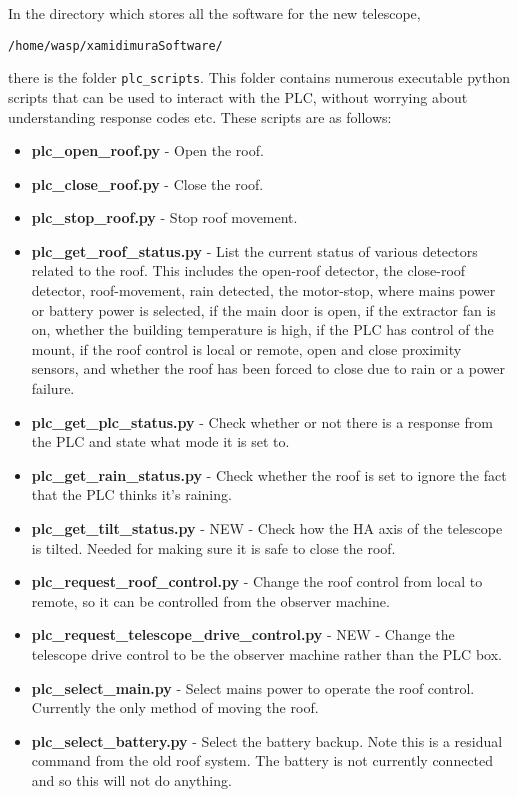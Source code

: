 \documentclass[a4paper,12pt]{article}
\begin{document}
In the directory which stores all the software for the new telescope,
\begin{verbatim}
/home/wasp/xamidimuraSoftware/
\end{verbatim}
there is the folder {\tt plc\_scripts}. This folder contains numerous executable python scripts that can be used to interact with the PLC, without worrying about understanding response codes etc. These scripts are as follows:
\begin{itemize}
\item{{\bf plc\_open\_roof.py} - Open the roof.}
\item{{\bf plc\_close\_roof.py} - Close the roof.}
\item{{\bf plc\_stop\_roof.py} - Stop roof movement.}
\item{{\bf plc\_get\_roof\_status.py} - List the current status of various detectors related to the roof. This includes the open-roof detector, the close-roof detector, roof-movement, rain detected, the motor-stop, where mains power or battery power is selected, if the main door is open, if the extractor fan is on, whether the building temperature is high, if the PLC has control of the mount, if the roof control is local or remote, open and close proximity sensors, and whether the roof has been forced to close due to rain or a power failure.}
\item{{\bf plc\_get\_plc\_status.py} - Check whether or not there is a response from the PLC and state what mode it is set to.}
\item{{\bf plc\_get\_rain\_status.py} - Check whether the roof is set to ignore the fact that the PLC thinks it's raining.}
\item{{\bf plc\_get\_tilt\_status.py} - NEW - Check how the HA axis of the telescope is tilted. Needed for making sure it is safe to close the roof.}
\item{{\bf plc\_request\_roof\_control.py} - Change the roof control from local to remote, so it can be controlled from the observer machine.}
\item{{\bf plc\_request\_telescope\_drive\_control.py} - NEW - Change the telescope drive control to be the observer machine rather than the PLC box.}
\item{{\bf plc\_select\_main.py} - Select mains power to operate the roof control. Currently the only method of moving the roof.}
\item{{\bf plc\_select\_battery.py} - Select the battery backup. Note this is a residual command from the old roof system. The battery is not currently connected and so this will not do anything.}

\end{itemize}
\end{document}
